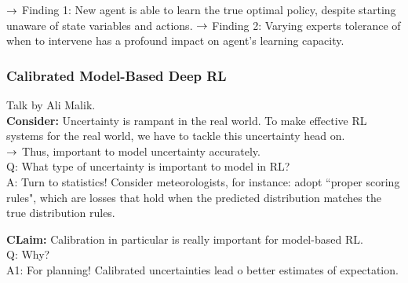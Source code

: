 $\rightarrow$ Finding 1: New agent is able to learn the true optimal policy, despite starting unaware of state variables and actions. 
$\rightarrow$ Finding 2: Varying experts tolerance of when to intervene has a profound impact on agent's learning capacity.

\spacerule
\subsubsection{Calibrated Model-Based Deep RL~\cite{malik2019calibrated}}

Talk by Ali Malik. \\

{\bf Consider:} Uncertainty is rampant in the real world. To make effective RL systems for the real world, we have to tackle this uncertainty head on. \\


$\rightarrow$ Thus, important to model uncertainty accurately. \\

Q: What type of uncertainty is important to model in RL? \\

A: Turn to statistics! Consider meteorologists, for instance: adopt ``proper scoring rules", which are losses that hold when the predicted distribution matches the true distribution rules. \\



{\bf CLaim:} Calibration in particular is really important for model-based RL. \\

Q: Why? \\

A1: For planning! Calibrated uncertainties lead o better estimates of expectation. 

